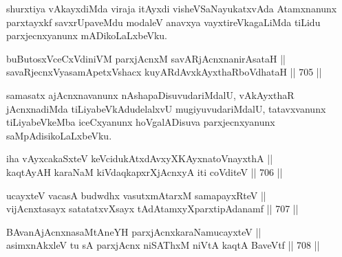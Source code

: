 \begin{artha} 
shurxtiya vAkayxdiMda viraja itAyxdi visheVSaNayukatxvAda Atamxnanunx 
parxtayxkf savxrUpaveMdu modaleV anavxya vayxtireVkagaLiMda tiLidu 
parxjecnxyanunx mADikoLaLxbeVku.
\end{artha}


\begin{shl}
buButosxVceCxVdiniVM parxjAcnxM savARjAcnxnanirAsataH || \\
savaRjecnxVyasamApetxVshacx kuyARdAvxkAyxthaRboVdhataH \hfill || 705 ||  
\end{shl}

\begin{artha} 
samasatx ajAcnxnavanunx nAshapaDisuvudariMdalU, vAkAyxthaR 
jAcnxnadiMda tiLiyabeVkAdudelalxvU mugiyuvudariMdalU, tatavxvanunx 
tiLiyabeVkeMba iceCxyanunx hoVgalADisuva parxjecnxyanunx 
saMpAdisikoLaLxbeVku.
\end{artha}



\begin{shl}
iha vAyxcakaSxteV keVcidukAtxdAvxyXKAyxnatoV\s nayxthA || \\
kaqtAyAH karaNaM kiVdaqkapxrXjAcnxyA iti coVditeV \hfill || 706 ||  
\end{shl}
				
\begin{shl}
ucayxteV vacasA budwdhx vasutxmAtarxM samapayxRteV || \\
vijAcnxtasayx satatatxvXsayx tAdAtamxyXparxtipAdanamf \hfill || 707 ||  
\end{shl}
				
\begin{shl}
BAvanAjAcnxnasaMtAneYH parxjAcnxkaraNamucayxteV ||  \\
asimxnAkxleV tu sA parxjAcnx niSAThxM niVtA kaqtA BaveVtf \hfill || 708 ||  
\end{shl}

